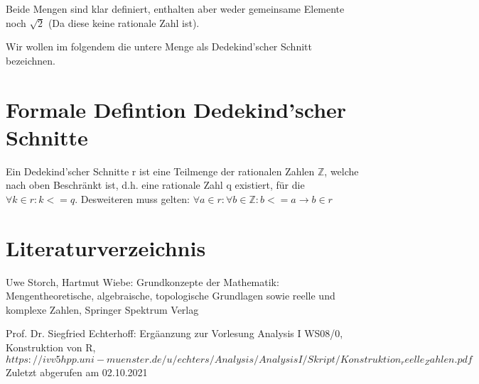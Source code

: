 \documentclass[12pt]{article}
\begin{document}
    Beide Mengen sind klar definiert, enthalten aber weder gemeinsame Elemente noch $\sqrt{2}$
    (Da diese keine rationale Zahl ist).

    Wir wollen im folgendem die untere Menge als Dedekind'scher Schnitt bezeichnen.

    \section{Formale Defintion Dedekind'scher Schnitte}

    Ein Dedekind'scher Schnitte r ist eine Teilmenge der rationalen Zahlen $\mathbb{Z}$, welche nach oben Beschränkt ist, d.h.
    eine rationale Zahl q existiert, für die $\forall k \in r: k <= q$.
    Desweiteren muss gelten: $\forall a \in r: \forall b \in \mathbb{Z}: b <= a \rightarrow b \in r$

    \newpage

    \appendix

    \newpage

    \section{Literaturverzeichnis}

    Uwe Storch, Hartmut Wiebe: Grundkonzepte der Mathematik: Mengentheoretische, algebraische, topologische Grundlagen
    sowie reelle und komplexe Zahlen, Springer Spektrum Verlag

    Prof. Dr. Siegfried Echterhoff: Ergäanzung zur Vorlesung Analysis I WS08/0, Konstruktion von R,
    $https://ivv5hpp.uni-muenster.de/u/echters/Analysis/AnalysisI/Skript/Konstruktion_reelle_Zahlen.pdf$
    Zuletzt abgerufen am 02.10.2021

    \newpage

\end{document}
